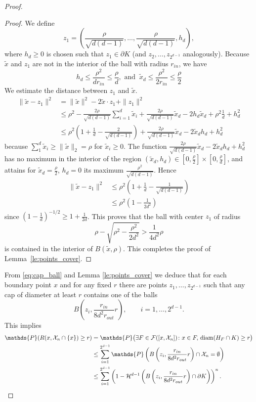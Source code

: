 \documentclass[12pt]{article}
\def\P{{\mathds{P}}}
\def\cF{{\mathcal F}}
\def\cH{{\mathcal H}}
\def\cX{{\mathcal X}}
\def\r{{\rho}}
\def\bd{{\partial}}
\theoremstyle{definition}
\begin{document}
\begin{proof}
\begin{proof}
We define
$$z_1 = \left(\frac \r {\sqrt {d(d-1)}}, \dots, \frac \rho {\sqrt {d(d-1)}} , h_d \right)    , $$
where $h_d\ge 0$ is chosen such that $z_1 \in \bd K $ (and $z_2, \dots , z_{2^{d-1}}$ analogously).
Because $\tilde x$ and $z_1$ are not in the interior of the ball with radius $r_{in}$, we have
$$
h_d \leq \frac {\r^2}{d r_{in}} \leq \frac {\r}{d }
, \text{ and }\ 
\tilde x_d \leq \frac {\rho^2}{2 r_{in}} \leq \frac {\rho}{2} 
$$
We estimate the distance between $z_1$ and $\tilde x$.
\begin{align*}
\| \tilde x -z_1  \|^2
&=
\| \tilde x \| ^2  -  2 \tilde x \cdot  z_{1}  +  \|z_{1}\|^2
\\ & \leq 
\rho^2   -   \frac{2\rho}{\sqrt{d(d-1)}} \sum_{i=1}^d \tilde x_i + \frac{2 \rho}{\sqrt{d(d-1)}} \tilde x_d - 2 h_d \tilde x_d  +  \rho^2 \frac 1d  + h_d^2
\\ & \leq
\rho^2 \left(1 + \frac 1 d - \frac{2}{\sqrt{d(d-1)}}\right) + \frac{2\rho }{\sqrt{d(d-1)}} \tilde x_d - 2 \tilde x_d h_d  + h_d^2
\end{align*}
because $\sum _1^d \tilde x_i \geq \| \tilde x \|_2 = \rho$ for $\tilde x_i \geq 0$.
The function $ \frac{2\rho }{\sqrt{d(d-1)}} \tilde x_d - 2 \tilde x_d h_d  + h_d^2 $ has no maximum in the interior of the region 
$(\tilde x_d, h_d) \in[0, \frac \rho 2] \times[0, \frac \rho d]$, and attains for $\tilde x_d= \frac \rho 2$, $h_d = 0$ its maximum $\frac{\rho ^2}{\sqrt{d(d-1)}}$. Hence
\begin{align*}
\| \tilde x -z_1  \|^2
& \leq
\rho^2 \left(1 + \frac 1 d - \frac{1}{\sqrt{d(d-1)}} \right)\\
& \leq  
\rho^2 \left(1 - \frac{1}{2d^2} \right)
\end{align*}
since $(1-\frac{1}{d})^{-1/2}\ge 1+\frac{1}{2d}$.
This proves that the ball with center $z_1$ of radius
$$
\rho- \sqrt{ \rho^2 - \frac{\rho^2}{2d^2}  } > \frac 1{4d^2} \rho
$$
is contained in the interior of $B(\tilde x, \rho)$. This completes the proof of Lemma~\ref{le:points_cover}.
\end{proof}

From \eqref{eq:cap_ball} and Lemma \ref{le:points_cover} we deduce that for each boundary point $x$ and for any fixed $r$ there are points $z_1, \dots, z_{2^{d-1}}$ such that any cap of diameter at least $r$ contains one of the balls
$$
B \left(z_i, \frac{r_{in}}{8 d^2 r_{out}} r \right),\qquad i=1,\dots,2^{d-1}.
$$
This implies
\begin{align*}
\P( R(x, \cX_{n} \cap\{x\}) \geq r)
& =
\P\big( \exists F \in \cF([x,\cX_{n}])\colon x \in F,\, {\rm diam}( H_F\cap K ) \geq r \big)
\\ & \leq
\sum_{i=1}^{2^{d-1}} \P  \left( B\left(z_i, \frac{r_{in}}{8 d^2 r_{out}} r \right) \cap \cX_{n} = \emptyset \right)
\\ & \leq
\sum_{i=1}^{2^{d-1}} \left(1- \cH^{d-1} \left(B\left(z_i, \frac{r_{in}}{8 d^2 r_{out}} r \right) \cap \bd K\right) \right)^{n}.
\end{align*}


\end{proof}
\end{document}
